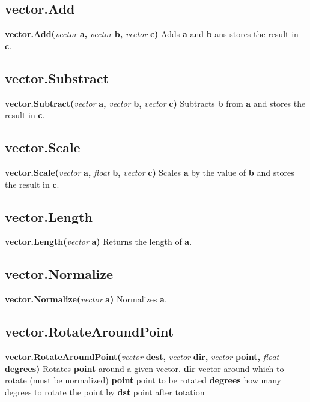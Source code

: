 \documentclass{scrreprt}
\begin{document}
\subsection{vector.Add}
\label{vect-add}
\textbf{vector.Add(}\textit{vector}\textbf{ a, }\textit{vector}\textbf{ b, }\textit{vector}\textbf{ c)}
\newline
Adds \textbf{a} and \textbf{b} ans stores the result in \textbf{c}.
\subsection{vector.Substract}
\label{vect-sub}
\textbf{vector.Subtract(}\textit{vector}\textbf{ a, }\textit{vector}\textbf{ b, }\textit{vector}\textbf{ c)}
\newline
Subtracts \textbf{b} from \textbf{a} and stores the result in \textbf{c}.
\subsection{vector.Scale}
\label{vect-scale}
\textbf{vector.Scale(}\textit{vector}\textbf{ a, }\textit{float}\textbf{ b, }\textit{vector}\textbf{ c)}
\newline
Scales \textbf{a} by the value of \textbf{b} and stores the result in \textbf{c}.
\subsection{vector.Length}
\label{vect-length}
\textbf{vector.Length(}\textit{vector}\textbf{ a)}
\newline
Returns the length of \textbf{a}.
\subsection{vector.Normalize}
\label{vect-norm}
\textbf{vector.Normalize(}\textit{vector}\textbf{ a)}
\newline
Normalizes \textbf{a}.
\subsection{vector.RotateAroundPoint}
\label{vect-rotarndpnt}
\textbf{vector.RotateAroundPoint(}\textit{vector}\textbf{ dest, }\textit{vector}\textbf{ dir, }\textit{vector}\textbf{ point, }\textit{float}\textbf{ degrees)}
\newline
Rotates \textbf{point} around a given vector.
\newline
\textbf{dir} vector around which to rotate (must be normalized)
\newline
\textbf{point} point to be rotated
\newline
\textbf{degrees} how many degrees to rotate the point by
\newline
\textbf{dst} point after totation
\end{document}

